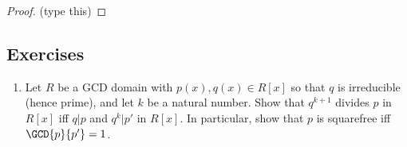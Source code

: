 \documentclass{article}
\begin{document}
\begin{proof}
(type this)
\end{proof}

\subsection*{Exercises}

\begin{enumerate}
\item Let $R$ be a GCD domain with $p(x), q(x) \in R[x]$ so that $q$ is irreducible (hence prime), and let $k$ be a natural number. Show that $q^{k+1}$ divides $p$ in $R[x]$ iff $q|p$ and $q^k|p'$ in $R[x]$. In particular, show that $p$ is squarefree iff $\GCD{p}{p'} = 1$. 
\end{enumerate}
\end{document}
